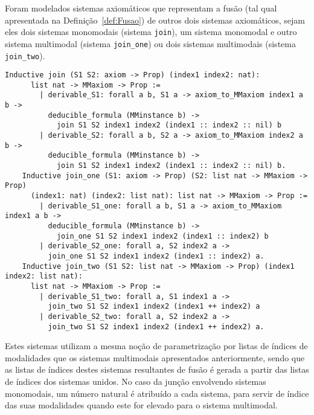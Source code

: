       Foram modelados sistemas axiomáticos que representam a fusão (tal qual apresentada na Definição~\ref{def:Fusao}) de outros dois sistemas axiomáticos, sejam eles dois sistemas
      monomodais (sistema \texttt{join}), um sistema monomodal e outro sistema multimodal (sistema \texttt{join\_one}) ou dois sistemas multimodais (sistema \texttt{join\_two}).
      \begin{lstlisting}[language=coq]
    Inductive join (S1 S2: axiom -> Prop) (index1 index2: nat):
      list nat -> MMaxiom -> Prop :=
        | derivable_S1: forall a b, S1 a -> axiom_to_MMaxiom index1 a b ->
          deducible_formula (MMinstance b) ->
            join S1 S2 index1 index2 (index1 :: index2 :: nil) b
        | derivable_S2: forall a b, S2 a -> axiom_to_MMaxiom index2 a b ->
          deducible_formula (MMinstance b) ->
            join S1 S2 index1 index2 (index1 :: index2 :: nil) b.
    Inductive join_one (S1: axiom -> Prop) (S2: list nat -> MMaxiom -> Prop)
      (index1: nat) (index2: list nat): list nat -> MMaxiom -> Prop :=
        | derivable_S1_one: forall a b, S1 a -> axiom_to_MMaxiom index1 a b ->
          deducible_formula (MMinstance b) ->
            join_one S1 S2 index1 index2 (index1 :: index2) b
        | derivable_S2_one: forall a, S2 index2 a ->
          join_one S1 S2 index1 index2 (index1 :: index2) a.
    Inductive join_two (S1 S2: list nat -> MMaxiom -> Prop) (index1 index2: list nat):
      list nat -> MMaxiom -> Prop :=
        | derivable_S1_two: forall a, S1 index1 a ->
          join_two S1 S2 index1 index2 (index1 ++ index2) a
        | derivable_S2_two: forall a, S2 index2 a ->
          join_two S1 S2 index1 index2 (index1 ++ index2) a.
      \end{lstlisting}
      Estes sistemas utilizam a mesma noção de parametrização por listas de índices de modalidades que os sistemas multimodais apresentados anteriormente, sendo que as listas
      de índices destes sistemas resultantes de fusão é gerada a partir das listas de índices dos sistemas unidos. No caso da junção envolvendo sistemas monomodais,
      um número natural é atribuído a cada sistema, para servir de índice das suas modalidades quando este for elevado para o sistema multimodal.

